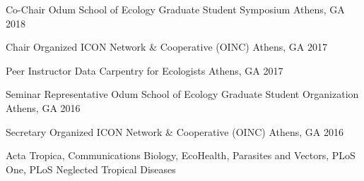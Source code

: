 
\begin{cvhonors}
\cvhonor
    {Co-Chair} %
    {Odum School of Ecology Graduate Student Symposium} %
    {Athens, GA} %
    {2018} %

\cvhonor
    {Chair} %
    {Organized ICON Network \& Cooperative (OINC)} %
    {Athens, GA} %
    {2017} %

\cvhonor
    {Peer Instructor} %
    {Data Carpentry for Ecologists} %
    {Athens, GA} %
    {2017} %

\cvhonor
    {Seminar Representative} %
    {Odum School of Ecology Graduate Student Organization} %
    {Athens, GA} %
    {2016} %

\cvhonor
    {Secretary} %
    {Organized ICON Network \& Cooperative (OINC)} %
    {Athens, GA} %
    {2016} %

\end{cvhonors}


Acta Tropica, Communications Biology, EcoHealth, Parasites and Vectors, PLoS One, PLoS Neglected Tropical Diseases



